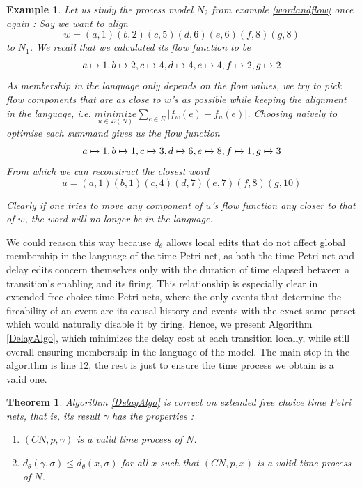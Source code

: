 \documentclass[conference]{IEEEtran}
\newtheorem{theorem}{Theorem}
\newtheorem{example}{Example}
\begin{document}
	\begin{example}
		Let us study the process model $N_2$ from example \ref{wordandflow} once again : 
		Say we want to align  $$w = (a, 1)(b, 2)(c, 5)(d, 6)(e, 6)(f, 8)(g,8)$$ to $N_1$. We recall that we calculated its flow function to be $$a \xmapsto{}{} 1, b \xmapsto{}{} 2, c \xmapsto{}{} 4, d \xmapsto{}{} 4, e \xmapsto{}{} 4, f \xmapsto{}{} 2, g \xmapsto{}{} 2$$
		As membership in the language only depends on the flow values, we try to pick flow components that are as close to $w$'s as possible while keeping the alignment in the language, i.e. $\underset{u \in \mathcal{L}(N)}{minimize} {\sum_{e \in E} |f_w(e) - f_u(e)|}$. Choosing naively to optimise each summand gives us the flow function $$a \xmapsto{}{} 1, b \xmapsto{}{} 1, c \xmapsto{}{} 3, d \xmapsto{}{} 6, e \xmapsto{}{} 8, f \xmapsto{}{} 1, g \xmapsto{}{} 3$$ From which we can reconstruct the closest word $$u = (a, 1)(b, 1)(c, 4)(d, 7)(e, 7)(f, 8)(g, 10)$$
		
		Clearly if one tries to move any component of $u$'s flow function any closer to that of $w$, the word will no longer be in the language. 
		
	\end{example}
	We could reason this way because $d_\theta$ allows local edits that do not affect global membership in the language of the time Petri net, as both the time Petri net and delay edits concern themselves only with the duration of time elapsed between a transition's enabling and its firing. 
	This relationship is especially clear in extended free choice time Petri nets, where the only events that determine the fireability of an event are its causal history and events with the exact same preset which would naturally disable it by firing. 
	Hence, we present Algorithm \ref{DelayAlgo}, which minimizes the delay cost at each transition locally, while still overall ensuring membership in the language of the model. The main step in the algorithm is line 12, the rest is just to ensure the time process we obtain is a valid one. 

	
	\begin{theorem}\label{DelayAlgoCorr} Algorithm \ref{DelayAlgo} is correct on extended free choice time Petri nets, that is, its result $\gamma$ has the properties : 
		\begin{enumerate}
			\item $(CN, p, \gamma)$ is a valid time process of $N$. 
			\item $d_\theta(\gamma, \sigma)  \leq  {d_\theta(x, \sigma)}$ for all $x$ such that $(CN, p, x)$ is a valid time process of $N$. 
		\end{enumerate}
	\end{theorem}
	
\end{document}
